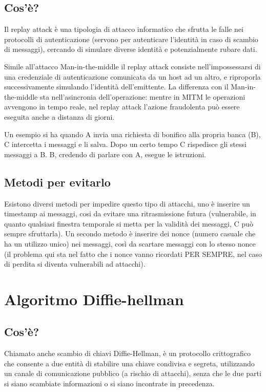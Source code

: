 \subsection{Cos'è?}
Il replay attack è una tipologia di attacco informatico che sfrutta le falle nei protocolli di autenticazione (servono per autenticare l'identità in caso di scambio di messaggi), cercando di simulare diverse identità e potenzialmente rubare dati.

Simile all'attacco Man-in-the-middle il replay attack consiste nell'impossessarsi di una credenziale di autenticazione comunicata da un host ad un altro, e riproporla successivamente simulando l'identità dell'emittente. La differenza con il Man-in-the-middle sta nell'asincronia dell'operazione: mentre in MITM le operazioni avvengono in tempo reale, nel replay attack l'azione fraudolenta può essere eseguita anche a distanza di giorni.

Un esempio si ha quando A invia una richiesta di bonifico alla propria banca (B), C intercetta i messaggi e li salva. Dopo un certo tempo C rispedisce gli stessi messaggi a B. B, credendo di parlare con A, esegue le istruzioni. 
\subsection{Metodi per evitarlo}
Esistono diversi metodi per impedire questo tipo di attacchi, uno è inserire un timestamp ai messaggi, cosi da evitare una ritrasmissione futura (vulnerabile, in quanto qualsiasi finestra temporale si metta per la validità dei messaggi, C può sempre sfruttarla).
Un secondo metodo è inserire dei nonce (numero casuale che ha un utilizzo unico) nei messaggi, così da scartare messaggi con lo stesso nonce (il problema qui sta nel fatto che i nonce vanno ricordati PER SEMPRE, nel caso di perdita si diventa vulnerabili ad attacchi).

\section{Algoritmo Diffie-hellman}
\subsection{Cos'è?}
Chiamato anche scambio di chiavi Diffie-Hellman, è un protocollo crittografico che consente a due entità di stabilire una chiave condivisa e segreta, utilizzando un canale di comunicazione pubblico (a rischio di attacchi), senza che le due parti si siano scambiate informazioni o si siano incontrate in precedenza.

